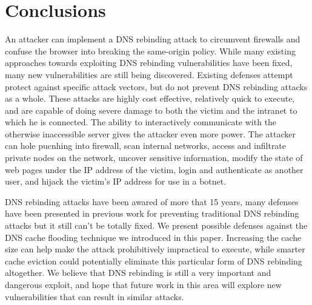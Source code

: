 \section{Conclusions}
\label{sec:conc}

An attacker can implement a DNS rebinding attack to circumvent firewalls and confuse the browser into breaking the same-origin policy. 
While many existing approaches towards exploiting DNS rebinding vulnerabilities have been fixed, many new vulnerabilities are still being discovered. Existing defenses attempt protect against specific attack vectors, but do not prevent DNS rebinding attacks as a whole. These attacks are highly cost effective, relatively quick to execute, and are capable of doing severe damage to both the victim and the intranet to which he is connected. The ability to interactively communicate with the otherwise inaccessible server gives the attacker even more power. The attacker can hole pucnhing into firewall, scan internal networks, access and infiltrate private nodes on the network, uncover sensitive information, modify the state of web pages under the IP address of the victim, login and authenticate as another user, and hijack the victim's IP address for use in a botnet.

DNS rebinding attacks have been awared of more that 15 years, many defenses have been presented in previous work for preventing traditional DNS rebinding attacks but it still can't be totally fixed. We present possible defenses against the DNS cache flooding technique we introduced in this paper. Increasing the cache size can help make the attack prohibitively impractical to execute, while smarter cache eviction could potentially eliminate this particular form of DNS rebinding altogether. We believe that DNS rebinding is still a very important and dangerous exploit, and hope that future work in this area will explore new vulnerabilities that can result in similar attacks.
